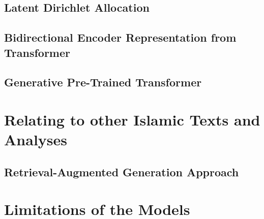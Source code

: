 \subsection{Latent Dirichlet Allocation}
\subsection{Bidirectional Encoder Representation from Transformer}
\subsection{Generative Pre-Trained Transformer}
\section{Relating to other Islamic Texts and Analyses}\label{sec:ch4_relating_islamic_texts}
\subsection{Retrieval-Augmented Generation Approach}
\section{Limitations of the Models}